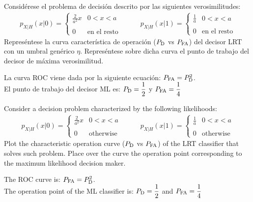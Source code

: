 \ifspanish

\question Considérese el problema de decisión descrito por las siguientes verosimilitudes:
 $$ \begin{array}{ll} 
 p_{X|H}(x|0) = \left\lbrace  \begin{array}{ll} \displaystyle \frac{2}{a^2} x & 0<x<a \\ \\
 0 & \mbox{en el resto}    \end{array}      \right. & \quad \quad
 p_{X|H}(x|1) = \left\lbrace  \begin{array}{ll} \displaystyle  \frac{1}{a} & 0<x<a \\ \\
 0 & \mbox{en el resto}    \end{array}      \right. 
 \end{array}$$	 
Represéntese la curva característica de operación ($P_{\rm D}$ vs $P_{\rm FA}$) del decisor LRT con un umbral genérico $\eta$. Represéntese sobre dicha curva el punto de trabajo del decisor de máxima verosimilitud.
\begin{solution}
La curva ROC viene dada por la siguiente ecuación: $P_{\rm FA}=P_{\rm D}^2$. \\
El punto de trabajo del decisor ML es: $P_{\rm D}=\displaystyle \frac{1}{2}$ y  $P_{\rm FA}=\displaystyle \frac{1}{4}$
\end{solution}

\else

\question Consider a decision problem characterized by the following likelihoods:
 $$ \begin{array}{ll} 
 p_{X|H}(x|0) = \left\lbrace  \begin{array}{ll} \displaystyle \frac{2}{a^2} x & 0<x<a \\ \\
 0 & \mbox{otherwise}    \end{array}      \right. & \quad \quad
 p_{X|H}(x|1) = \left\lbrace  \begin{array}{ll} \displaystyle  \frac{1}{a} & 0<x<a \\ \\
 0 & \mbox{otherwise}    \end{array}      \right. 
 \end{array}$$	 
Plot the characteristic operation curve ($P_{\rm D}$ vs $P_{\rm FA}$) of the LRT classifier that solves such problem. Place over the curve the operation point corresponding to the maximum likelihood decision maker.

\begin{solution}
The ROC curve is: $P_{\rm FA}=P_{\rm D}^2$. \\
The operation point of the ML classifier is: $P_{\rm D}=\displaystyle \frac{1}{2}$ and  $P_{\rm FA}=\displaystyle \frac{1}{4}$
\end{solution}

\fi